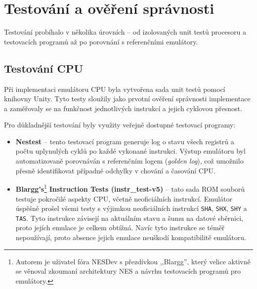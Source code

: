 \chapter{Testování a ověření správnosti}


Testování probíhalo v několika úrovních -- od izolovaných unit testů procesoru a testovacích
programů až po porovnání s referenčními emulátory.

\section{Testování CPU}

Při implementaci emulátoru CPU byla vytvořena sada unit testů pomocí knihovny Unity. Tyto testy
sloužily jako prvotní ověření správnosti implementace a zaměřovaly se na funkčnost jednotlivých
instrukcí a jejich cyklovou přesnost.

Pro důkladnější testování byly využity veřejně dostupné testovací programy:

\begin{itemize}
    \item \textbf{Nestest} -- tento testovací program generuje log o stavu všech registrů a počtu
        uplynulých cyklů po každé vykonané instrukci. Výstup emulátoru byl automatizovaně
        porovnáván s referenčním logem (\textit{golden log}), což umožnilo přesně identifikovat
        případné odchylky v chování a časování CPU.
    \item \textbf{Blargg's}\footnote{Autorem je uživatel fóra NESDev s přezdívkou ,,Blargg'', který
        velice aktivně se věnoval zkoumaní architektury NES a návrhu testovacích programů pro
    emulátory.} \textbf{Instruction Tests (instr\_test-v5)} -- tato sada ROM souborů testuje
    pokročilé aspekty CPU, včetně neoficiálních instrukcí. Emulátor úspěšně prošel všemi testy s
    výjimkou neoficiálních instrukcí \texttt{SHA}, \texttt{SHX}, \texttt{SHY} a \texttt{TAS}. Tyto
    instrukce závisejí na aktuálním stavu a šumu na datové sběrnici, proto jejích emulace je celkem
    obtížná. Navíc tyto instrukce se téměř nepoužívají, proto absence jejich emulace neuškodí
    kompatibilitě emulátoru.
\end{itemize}

